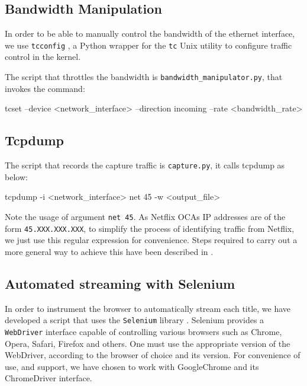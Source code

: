 \subsection{Bandwidth Manipulation}

In order to be able to manually control the bandwidth of the ethernet
interface, we use \texttt{tcconfig} \cite{tcconfig}, a Python wrapper for the
\texttt{tc} \cite{tc} Unix utility to configure traffic control in the kernel.

The script that throttles the bandwidth is \texttt{bandwidth\_manipulator.py},
that invokes the command:

\begin{bash_script}[caption={Enforce a bandwidth rate on the specified interface}, label={tcconfig}]
tcset --device <network_interface> --direction incoming --rate <bandwidth_rate>
\end{bash_script}


\subsection{Tcpdump}

The script that records the capture traffic is \texttt{capture.py}, it calls tcpdump as below:

\begin{bash_script}[caption={Listens for TCP/IP traffic on the specified interface}, label={tcpdump}]
tcpdump -i <network_interface> net 45 -w <output_file>
\end{bash_script}

Note the usage of argument \texttt{net 45}. As Netflix OCAs IP addresses are of
the form \texttt{45.XXX.XXX.XXX}, to simplify the process of identifying
traffic from Netflix, we just use this regular expression for convenience.
Steps required to carry out a more general way to achieve this have been
described in .

\subsection{Automated streaming with Selenium}

In order to instrument the browser to automatically stream each title, we have
developed a script that uses the \texttt{Selenium} library \cite{selenium}.
Selenium provides a \texttt{WebDriver} interface capable of controlling various
browsers such as Chrome, Opera, Safari, Firefox and others. One must use the
appropriate version of the WebDriver, according to the browser of choice and
its version. For convenience of use, and support, we have chosen to work with
GoogleChrome and its ChromeDriver interface.

